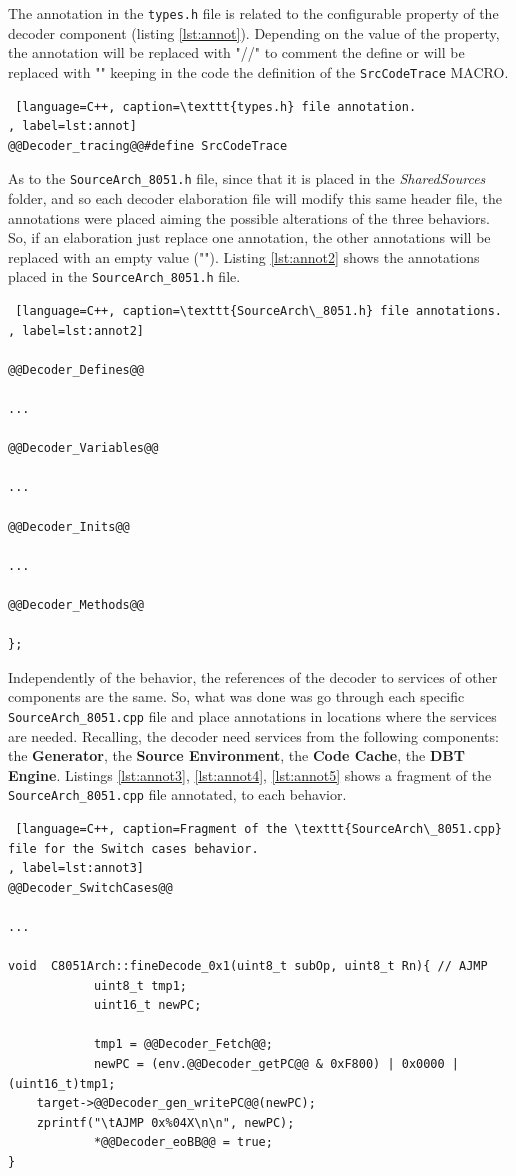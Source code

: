 The annotation in the \texttt{types.h} file is related to the configurable property of the decoder component (listing \ref{lst:annot}). Depending on the value of the property, the annotation will be replaced with "//" to comment the define or will be replaced with "" keeping in the code the definition of the \texttt{SrcCodeTrace} MACRO.

\begin{lstlisting} [language=C++, caption=\texttt{types.h} file annotation.
, label=lst:annot]
@@Decoder_tracing@@#define SrcCodeTrace
\end{lstlisting}

As to the \texttt{SourceArch\_8051.h} file, since that it is placed in the \textit{SharedSources} folder, and so each decoder elaboration file will modify this same header file, the annotations were placed aiming the possible alterations of the three behaviors. So, if an elaboration just replace one annotation, the other annotations will be replaced with an empty value (""). Listing \ref{lst:annot2} shows the annotations placed in the \texttt{SourceArch\_8051.h} file.

\begin{lstlisting} [language=C++, caption=\texttt{SourceArch\_8051.h} file annotations.
, label=lst:annot2]

@@Decoder_Defines@@

...

@@Decoder_Variables@@

...

@@Decoder_Inits@@

...

@@Decoder_Methods@@ 

};
\end{lstlisting}


Independently of the behavior, the references of the decoder to services of other components are the same. So, what was done was go through each specific \texttt{SourceArch\_8051.cpp} file and place annotations in locations where the services are needed. Recalling, the decoder need services from the following components: the \textbf{Generator}, the \textbf{Source Environment}, the \textbf{Code Cache}, the \textbf{DBT Engine}. Listings \ref{lst:annot3}, \ref{lst:annot4}, \ref{lst:annot5} shows a fragment of the \texttt{SourceArch\_8051.cpp} file annotated, to each behavior.


\begin{lstlisting} [language=C++, caption=Fragment of the \texttt{SourceArch\_8051.cpp} file for the Switch cases behavior.
, label=lst:annot3]
@@Decoder_SwitchCases@@

...

void  C8051Arch::fineDecode_0x1(uint8_t subOp, uint8_t Rn){	// AJMP
			uint8_t tmp1;
			uint16_t newPC; 

			tmp1 = @@Decoder_Fetch@@;
			newPC = (env.@@Decoder_getPC@@ & 0xF800) | 0x0000 | (uint16_t)tmp1; 
  	target->@@Decoder_gen_writePC@@(newPC);	
  	zprintf("\tAJMP 0x%04X\n\n", newPC);
			*@@Decoder_eoBB@@ = true;		
}
\end{lstlisting}

